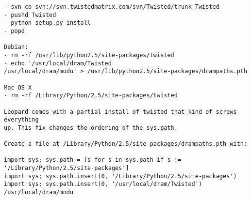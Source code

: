 \begin{verbatim}
- svn co svn://svn.twistedmatrix.com/svn/Twisted/trunk Twisted
- pushd Twisted
- python setup.py install
- popd

Debian:
- rm -rf /usr/lib/python2.5/site-packages/twisted
- echo '/usr/local/dram/Twisted
/usr/local/dram/modu' > /usr/lib/python2.5/site-packages/drampaths.pth

Mac OS X
- rm -rf /Library/Python/2.5/site-packages/twisted

Leopard comes with a partial install of twisted that kind of screws everything
up. This fix changes the ordering of the sys.path.

Create a file at /Library/Python/2.5/site-packages/drampaths.pth with:

import sys; sys.path = [s for s in sys.path if s != '/Library/Python/2.5/site-packages']
import sys; sys.path.insert(0, '/Library/Python/2.5/site-packages')
import sys; sys.path.insert(0, '/usr/local/dram/Twisted')
/usr/local/dram/modu
\end{verbatim}


